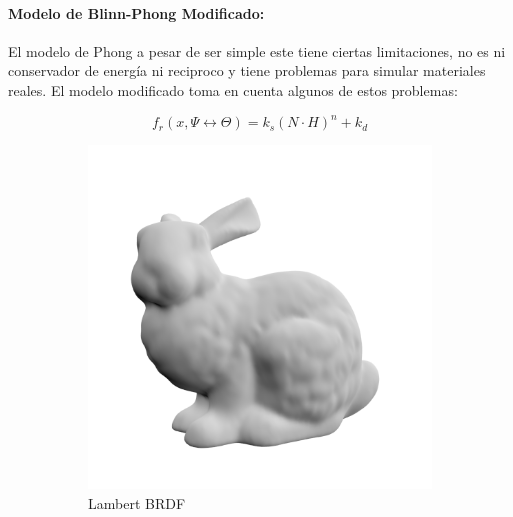 \paragraph{Modelo de Blinn-Phong Modificado:}
El modelo de Phong a pesar de ser simple este tiene ciertas limitaciones, no es ni conservador de energía ni reciproco y tiene problemas para simular materiales reales. El modelo modificado toma en cuenta algunos de estos problemas:

\begin{equation}
    f_{r}(x, \Psi\leftrightarrow\Theta) = k_{s}(N\cdot H)^n + k_{d}
    \label{eq:blinn_phong}
\end{equation}

\begin{figure}[H]
	\centering
	\begin{subfigure}[t]{0.33\textwidth}
		\centering
		\captionsetup{justification=centering}
		\includegraphics[width=\linewidth]{media/diffuse_bunny.png}
		\caption*{Lambert \ac{BRDF}}
	\end{subfigure}%
	\begin{subfigure}[t]{0.33\textwidth}
		\centering
		\captionsetup{justification=centering}

\end{subfigure}
\end{figure}
